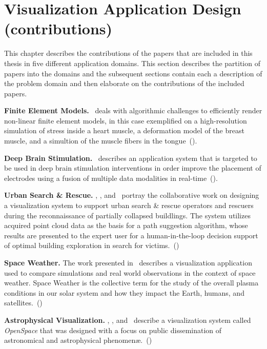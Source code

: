 
\chapter{Visualization Application Design (contributions)} \label{cha:contributions}

This chapter describes the contributions of the papers that are included in this thesis in five different application domains.  This section describes the partition of papers into the domains and the subsequent sections contain each a description of the problem domain and then elaborate on the contributions of the included papers.

\textbf{Finite Element Models. } \paperFEM\ deals with algorithmic challenges to efficiently render non-linear finite element models, in this case exemplified on a high-resolution simulation of stress inside a heart muscle, a deformation model of the breast muscle, and a simultion of the muscle fibers in the tongue~().

\textbf{Deep Brain Stimulation. } \paperDBS\ describes an application system that is targeted to be used in deep brain stimulation interventions in order improve the placement of electrodes using a fusion of multiple data modalities in real-time~().

\textbf{Urban Search \& Rescue. } \paperVMV, \paperSSRR, and \paperCGF\ portray the collaborative work on designing a visualization system to support urban search \& rescue operators and rescuers during the reconnaissance of partially collapsed buildlings.  The system utilizes acquired  point cloud data as the basis for a path suggestion algorithm, whose results are presented to the expert user for a human-in-the-loop decision support of optimal building exploration in search for victims.~()

\textbf{Space Weather. } The work presented in \paperCME\ describes a visualization application used to compare simulations and real world observations in the context of space weather.  Space Weather is the collective term for the study of the overall plasma conditions in our solar system and how they impact the Earth, humans, and satellites.~()

\textbf{Astrophysical Visualization. } \paperDSG, \paperGB, and \paperOS\  describe a visualization system called \emph{OpenSpace} that was designed with a focus on public dissemination of astronomical and astrophysical phenomen\ae.~()

